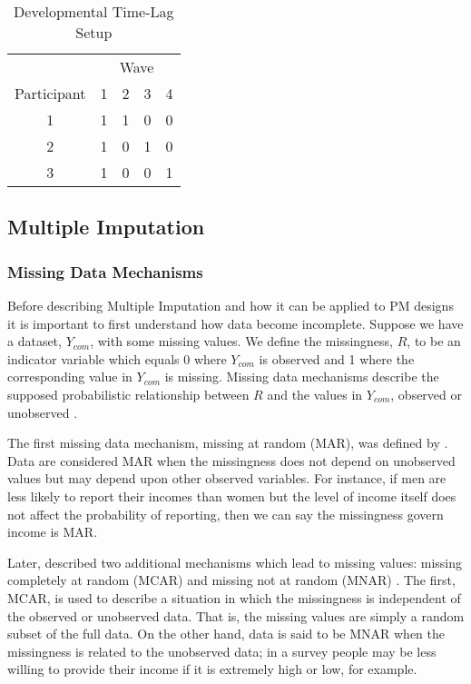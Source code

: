 \documentclass{svjour3}                     %
\begin{document}
\begin{table}[b!]
	\centering
	\caption{Developmental Time-Lag Setup}
	\label{tab:table13}
	\setlength{\tabcolsep}{0.75cm}
	\begin{tabular}{c|cccc}
		\toprule
		& \multicolumn{4}{c}{Wave} \\
		Participant & 1 & 2 & 3 & 4 \\
		\midrule
		1 & 1 & 1 & 0 & 0 \\
		2 & 1 & 0 & 1 & 0 \\
		3 & 1 & 0 & 0 & 1 \\
		\bottomrule
	\end{tabular}
\end{table}

\subsection{Multiple Imputation}
\label{sec:1.3}
\subsubsection{Missing Data Mechanisms}
\label{sec:1.3.1}
Before describing Multiple Imputation and how it can be applied to PM designs it is important to first understand how data become incomplete. Suppose we have a dataset, $Y_{com}$, with some missing values. We define the missingness, $R$, to be an indicator variable which equals 0 where $Y_{com}$ is observed and 1 where the corresponding value in $Y_{com}$ is missing. Missing data mechanisms describe the supposed probabilistic relationship between $R$ and the values in $Y_{com}$, observed or unobserved \citep{little2014statistical}. \par

The first missing data mechanism, missing at random (MAR), was defined by \citet{rubin1976inference}. Data are considered MAR when the missingness does not depend on unobserved values but may depend upon other observed variables. For instance, if men are less likely to report their incomes than women but the level of income itself does not affect the probability of reporting, then we can say the missingness govern income is MAR. \par

Later, \citet{little2014statistical} described two additional mechanisms which lead to missing values: missing completely at random (MCAR) and missing not at random (MNAR) \citep{little2014statistical}. The first, MCAR, is used to describe a situation in which the missingness is independent of the observed or unobserved data. That is, the missing values are simply a random subset of the full data. On the other hand, data is said to be MNAR when the missingness is related to the unobserved data; in a survey people may be less willing to provide their income if it is extremely high or low, for example. \par
\end{document}
